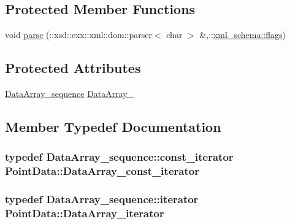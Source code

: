 \subsection*{Protected Member Functions}
\begin{DoxyCompactItemize}
\item 
void \hyperlink{classPointData_a67ad25c5798d484eb8169a90fda2eac5}{parse} (\+::xsd\+::cxx\+::xml\+::dom\+::parser$<$ char $>$ \&,\+::\hyperlink{namespacexml__schema_a0612287d030cb2732d31a45b258fdc87}{xml\+\_\+schema\+::flags})
\end{DoxyCompactItemize}
\subsection*{Protected Attributes}
\begin{DoxyCompactItemize}
\item 
\hyperlink{classPointData_acd882fa412789571fcaa2599ad2b2c71}{Data\+Array\+\_\+sequence} \hyperlink{classPointData_ac8eb59ecb308a38ccd18bd6185e32a92}{Data\+Array\+\_\+}
\end{DoxyCompactItemize}


\subsection{Member Typedef Documentation}
\subsubsection[{\texorpdfstring{Data\+Array\+\_\+const\+\_\+iterator}{DataArray_const_iterator}}]{\setlength{\rightskip}{0pt plus 5cm}typedef Data\+Array\+\_\+sequence\+::const\+\_\+iterator {\bf Point\+Data\+::\+Data\+Array\+\_\+const\+\_\+iterator}}\hypertarget{classPointData_a6bd3313479b6a109e24bc9e7b306831b}{}\label{classPointData_a6bd3313479b6a109e24bc9e7b306831b}
\subsubsection[{\texorpdfstring{Data\+Array\+\_\+iterator}{DataArray_iterator}}]{\setlength{\rightskip}{0pt plus 5cm}typedef Data\+Array\+\_\+sequence\+::iterator {\bf Point\+Data\+::\+Data\+Array\+\_\+iterator}}\hypertarget{classPointData_afb66f793f2a65ca38e3cd8fa21eef701}{}\label{classPointData_afb66f793f2a65ca38e3cd8fa21eef701}
